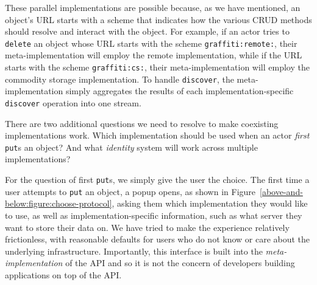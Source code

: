 These parallel implementations are possible because, as we have mentioned, an object's URL starts with a scheme that indicates
how the various CRUD methods should resolve and interact with the object.
For example, if an actor tries to \texttt{delete} an object whose URL starts with the scheme
\texttt{graffiti:remote:}, their meta-implementation will employ the remote implementation,
while if the URL starts with the scheme \texttt{graffiti:cs:},
their meta-implementation will employ the commodity storage implementation.
To handle \texttt{discover}, the meta-implementation simply aggregates
the results of each implementation-specific \texttt{discover}
operation into one stream.

There are two additional questions we need to resolve to
make coexisting implementations work.
Which implementation should be used
when an actor \emph{first} \texttt{put}s an object?
And what \emph{identity} system will work across multiple
implementations?

For the question of first \texttt{put}s, we simply give the user the choice.
The first time a user attempts to \texttt{put} an object,
a popup opens,
as shown in Figure~\ref{above-and-below:figure:choose-protocol},
asking them which implementation they would like to use,
as well as implementation-specific information, such as what server
they want to store their data on.
We have tried to make the experience relatively frictionless, with
reasonable defaults for
users who do not know or care about the underlying infrastructure.
Importantly, this interface is built into the \emph{meta-implementation}
of the API and so it is not the concern of developers building
applications on top of the API.

